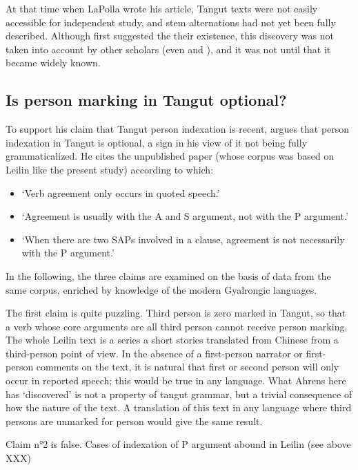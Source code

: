 \documentclass[oldfontcommands,oneside,a4paper,11pt]{article}
\begin{document}
At that time when LaPolla wrote his article, Tangut texts were not easily accessible for independent study, and stem alternations had not yet been fully described. Although \citet{nishida75} first suggested the their existence, this discovery was not taken into account by other scholars (even \citealt{kepping85} and \citealt{driem91tangut}), and it was not until \citet{gong01huying} that it became widely known. 
 

\subsection{Is person marking in Tangut optional?}
To support his claim that Tangut person indexation is recent, 
\citet{lapolla92} argues that person indexation in Tangut is optional, a sign in his view of it not being fully grammaticalized. He cites the unpublished paper \citet{ahrens90tangut} (whose corpus was based on Leilin like the present study) according to which:

\begin{itemize}
\item `Verb agreement only occurs in quoted speech.'
\item `Agreement is usually with the A and S argument, not with the P argument.'
\item `When there are two SAPs involved in a clause, agreement is not necessarily with the P argument.'
\end{itemize}

In the following, the three claims are examined on the basis of data from the same corpus, enriched by knowledge of the modern Gyalrongic languages.

The first claim is quite puzzling. Third person is zero marked in Tangut, so that a verb whose core arguments are all third person cannot receive person marking. The whole Leilin text is a series a short stories translated from Chinese from a third-person point of view. In the absence of a first-person narrator or first-person comments on the text, it is natural that first or second person will only occur in reported speech; this would be true in any language. What Ahrens here has `discovered' is not a property of tangut grammar, but a trivial consequence of how the nature of the text. A translation of this text in any language where third persons are unmarked for person would give the same result.

Claim n°2 is false. Cases of indexation of P argument abound in Leilin (see above XXX)
\end{document}
